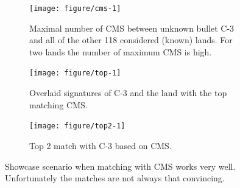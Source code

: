 \documentclass[aoas, preprint]{imsart}\usepackage[]{graphicx}\usepackage[]{color}
\newenvironment{knitrout}{}{} %
\begin{document}
\begin{figure}[hbtp]
\begin{subfigure}[t]{\textwidth}\centering
\caption{Maximal number of CMS between unknown bullet C-3 and all of the other 118 considered (known) lands. For two lands the number of maximum CMS is high. }
\begin{knitrout}
\color{fgcolor}
\texttt{[image: figure/cms-1]} 

\end{knitrout}
\end{subfigure}
\begin{subfigure}[b]{.49\textwidth}\centering
\caption{Overlaid signatures of C-3 and the land with the top matching CMS.}
\begin{knitrout}
\color{fgcolor}
\texttt{[image: figure/top-1]} 

\end{knitrout}
\end{subfigure}
\begin{subfigure}[b]{.49\textwidth}\centering
\caption{Top 2 match with C-3 based on CMS.}
\begin{knitrout}
\color{fgcolor}
\texttt{[image: figure/top2-1]} 

\end{knitrout}
\end{subfigure}
\caption{\label{fig:hamby-perfect}Showcase scenario  when matching with CMS works very well. Unfortunately the matches are not always that convincing.}
\end{figure}
\end{document}
